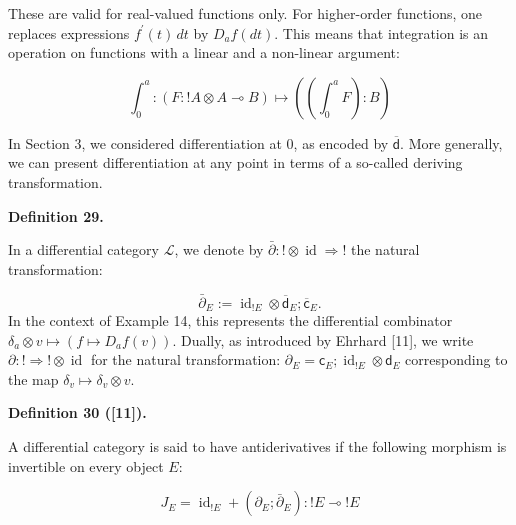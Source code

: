 \documentclass[10pt,a4paper]{article}
\newcommand{\oc}{!}
\begin{document}
 
These are valid for real-valued functions only. For higher-order functions, one replaces expressions $f^{\prime}(t)\,dt$ by $D_{a}f(dt)$. This means that integration is an operation on functions with a linear and a non-linear argument:\par
    \[\int_{0}^{a}:(F:\oc A\otimes A\multimap B)\mapsto\left(\left(\int_{0}^{a}F\right):B\right)\]    
 
 
In Section 3, we considered differentiation at $0$, as encoded by $\overline{\mathsf{d}}$. More generally, we can present differentiation at any point in terms of a so-called deriving transformation.\par
 
 
 
\par\medskip\noindent\textbf{Definition 29.}\par
 
 
In a differential category $\mathscr{L}$, we denote by $\bar{\partial}:\oc\otimes\operatorname{id}\Rightarrow\oc$ the natural transformation:\par
    \[\bar{\partial}_{E}:=\operatorname{id}_{\oc E}\otimes\overline{\mathsf{d}}_{E};\overline{\mathsf{c}}_{E}.\]    
In the context of Example 14, this represents the differential combinator $\delta_{a}\otimes v\mapsto(f\mapsto D_{a}f(v))$. Dually, as introduced by Ehrhard [11], we write ${\partial}:\oc\Rightarrow\oc\otimes\operatorname{id}$ for the natural transformation: ${\partial}_{E}={\mathsf{c}}_{E};\operatorname{id}_{\oc E}\otimes{\mathsf{d}}_{E}$ corresponding to the map $\delta_{v}\mapsto\delta_{v}\otimes v$.\par
 
 
 
 
\par\medskip\noindent\textbf{Definition 30 ([11]).}\par
 
 
A differential category is said to have antiderivatives if the following morphism is invertible on every object $E$:\par
    \[J_{E}=\operatorname{id}_{\oc E}+({\partial}_{E};\bar{\partial}_{E}):\oc E\multimap\oc E\]    
 
\end{document}
